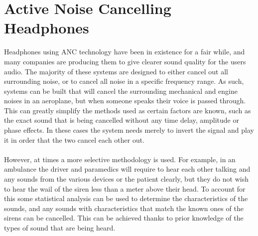 \section{Active Noise Cancelling Headphones}
Headphones using ANC technology have been in existence for a fair while, and many companies are producing them to give clearer sound quality for the users audio.
The majority of these systems are designed to either cancel out all surrounding noise, or to cancel all noise in a specific frequency range.
As such, systems can be built that will cancel the surrounding mechanical and engine noises in an aeroplane, but when someone speaks their voice is passed through.
This can greatly simplify the methods used as certain factors are known, such as the exact sound that is being cancelled without any time delay, amplitude or phase effects.
In these cases the system needs merely to invert the signal and play it in order that the two cancel each other out\cite{EMNoiseCancel}.
\\
\\
However, at times a more selective methodology is used. For example, in an ambulance the driver and paramedics will require to hear each other talking and any sounds from the various devices or the patient clearly, but they do not wish to hear the wail of the siren less than a meter above their head\cite{EMHeadsets}.
To account for this some statistical analysis can be used to determine the characteristics of the sounds, and any sounds with characteristics that match the known ones of the sirens can be cancelled.
This can be achieved thanks to prior knowledge of the types of sound that are being heard.
